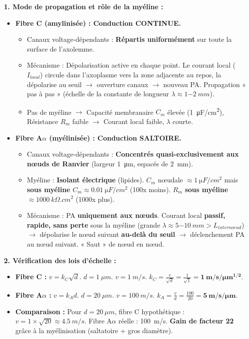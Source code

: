 \documentclass[11pt]{article}
\begin{document}
\begin{exoresolu}
\textbf{1. Mode de propagation et rôle de la myéline :}
\begin{itemize}
    \item \textbf{Fibre C (amylinisée) : Conduction CONTINUE.}
    \begin{itemize}
        \item Canaux  voltage-dépendants : \textbf{Répartis uniformément} sur toute la surface de l'axolemme.
        \item Mécanisme : Dépolarisation active en chaque point. Le courant local ($I_{local}$) circule dans l'axoplasme vers la zone adjacente au repos, la dépolarise au seuil $\rightarrow$ ouverture canaux  $\rightarrow$ nouveau PA. Propagation « pas à pas » (échelle de la constante de longueur $\lambda \approx \SI{1-2}{mm}$).
        \item Pas de myéline $\rightarrow$ Capacité membranaire $C_m$ élevée (\SI{1}{\micro F/cm^2}), Résistance $R_m$ faible $\rightarrow$ Courant local faible, $\lambda$ courte.
    \end{itemize}
    \item \textbf{Fibre A$\alpha$ (myélinisée) : Conduction SALTOIRE.}
    \begin{itemize}
        \item Canaux  voltage-dépendants : \textbf{Concentrés quasi-exclusivement aux nœuds de Ranvier} (largeur \SI{1}{\micro m}, espacés de \SI{2}{mm}).
        \item Myéline : \textbf{Isolant électrique} (lipides). $C_m$ nœudale $\approx \SI{1}{\micro F/cm^2}$ mais \textbf{sous myéline $C_m \approx \SI{0,01}{\micro F/cm^2}$} (100x moins). $R_m$ \textbf{sous myéline $\approx \SI{1000}{k\Omega.cm^2}$} (1000x plus).
        \item Mécanisme : PA \textbf{uniquement aux nœuds}. Courant local \textbf{passif, rapide, sans perte} sous la myéline (grande $\lambda \approx \SI{5-10}{mm} > L_{internoeud}$) $\rightarrow$ dépolarise le nœud suivant \textbf{au-delà du seuil} $\rightarrow$ déclenchement PA au nœud suivant. « Saut » de nœud en nœud.
    \end{itemize}
\end{itemize}

\textbf{2. Vérification des lois d'échelle :}
\begin{itemize}
    \item \textbf{Fibre C :} $v = k_C \sqrt{d}$. $d = \SI{1}{\mu m}$. $v = \SI{1}{m/s}$.
    $k_C = \frac{v}{\sqrt{d}} = \frac{1}{\sqrt{1}} = \mathbf{1\ m/s/\mu m^{1/2}}$.
    \item \textbf{Fibre A$\alpha$ :} $v = k_A d$. $d = \SI{20}{\mu m}$. $v = \SI{100}{m/s}$.
    $k_A = \frac{v}{d} = \frac{100}{20} = \mathbf{5\ m/s/\mu m}$.
    \item \textbf{Comparaison :} Pour $d = \SI{20}{\mu m}$, fibre C hypothétique : $v = 1 \times \sqrt{20} \approx \SI{4,5}{m/s}$. Fibre A$\alpha$ réelle : \SI{100}{m/s}. \textbf{Gain de facteur 22} grâce à la myélinisation (saltatoire + gros diamètre).
\end{itemize}


\end{exoresolu}
\end{document}
